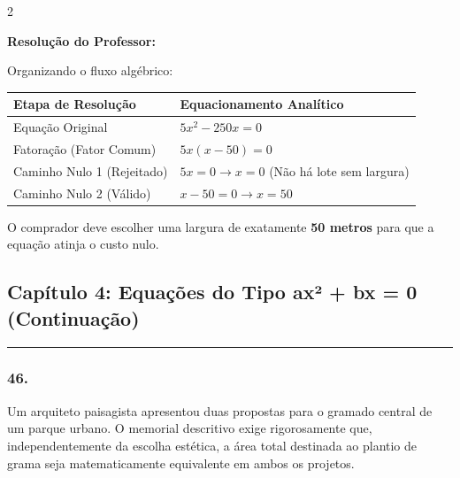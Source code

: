 \begin{multicols*}{2}
\ifgabarito
    \begin{tcolorbox}[colback=CorTitUm!5, colframe=CorTitUm, boxrule=1pt, arc=4pt, left=6pt, right=6pt, top=6pt, bottom=6pt]
    \small\textbf{\textcolor{CorTitUm}{Resolução do Professor:}}\par\vspace{0.1cm}
    \color{CinzaEscuro}
    Organizando o fluxo algébrico:
    \vspace{0.1cm}
    \begin{center}
    \begin{tabular}{|l|l|}
    \hline
    \textbf{Etapa de Resolução} & \textbf{Equacionamento Analítico} \\
    \hline
    Equação Original & $5x^2 - 250x = 0$ \\
    \hline
    Fatoração (Fator Comum) & $5x(x - 50) = 0$ \\
    \hline
    Caminho Nulo 1 (Rejeitado) & $5x = 0 \rightarrow x = 0$ (Não há lote sem largura) \\
    \hline
    Caminho Nulo 2 (Válido) & $x - 50 = 0 \rightarrow x = 50$ \\
    \hline
    \end{tabular}
    \end{center}
    \vspace{0.1cm}
    O comprador deve escolher uma largura de exatamente \textbf{50 metros} para que a equação atinja o custo nulo.
    \end{tcolorbox}
\fi

\par\vspace{\espacoQuestao}
\subsection*{Capítulo 4: Equações do Tipo ax² + bx = 0 (Continuação)}
\vspace{-0.2cm}\noindent\rule{\linewidth}{1.5pt} 
\par\vspace{\espacoPosTitulo}
\subsubsection*{46.} Um arquiteto paisagista apresentou duas propostas para o gramado central de um parque urbano. O memorial descritivo exige rigorosamente que, independentemente da escolha estética, a área total destinada ao plantio de grama seja matematicamente equivalente em ambos os projetos.


\end{multicols*}
